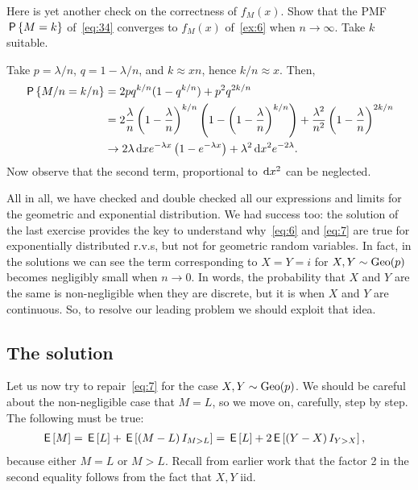 \documentclass[a4paper,12pt]{article}
\begin{document}
\begin{exercise}
Here is yet another check on the correctness of $f_M(x)$. 
Show that  the PMF $\P{M=k}$ of~\cref{eq:34} converges to $f_M(x)$ of~\cref{ex:6} when $n\to \infty$. Take $k$ suitable.
\begin{solution} Take $p=\lambda/n$,  $q=1-\lambda/n$, and $k \approx x n$, hence $k/n \approx x$. Then,
  \begin{align}
    \label{eq:31}
\P{M/n=k/n}  
&= 2 p q^{k/n}(1-q^{k/n}) + p^2q^{2k/n} \\
&= 2 \frac \lambda n \left(1-\frac \lambda n\right)^{k/n}\left(1-\left(1-\frac \lambda n\right)^{k/n}\right) + \frac{\lambda^2}{n^2}\left(1-\frac \lambda n \right)^{2k/n} \\
&\to 2 \lambda \d x e^{-\lambda x} \left(1 - e^{-\lambda x}\right) + \lambda^{2} \d x^{2}e^{-2\lambda}.\label{eq:37}
  \end{align}
Now observe that the second term, proportional to $\d x^{2}$ can be neglected. 
\end{solution}
\end{exercise}

All in all, we have checked and double checked all our expressions and limits for the geometric and exponential distribution.
We had success too: the solution of the last exercise provides the key to understand why~\eqref{eq:6} and \eqref{eq:7} are true for exponentially distributed r.v.s, but not for geometric random variables.
In fact, in the solutions we can see the term corresponding to $X=Y=i$ for $X,Y\sim \Geo{p}$ becomes negligibly small when $n\to 0$.
In words, the probability that $X$ and $Y$ are the same is non-negligible when they are discrete, but it is when $X$ and $Y$ are continuous.
So, to resolve our leading problem we should exploit that idea.

\subsection{The solution}
\label{sec:solution}


Let us now try to repair~\cref{eq:7}  for the case $X,Y\sim\Geo{p}$. We should be careful about the non-negligible case that $M=L$, so we move on, carefully, step by step. The following must be true:
\begin{align}
  \label{eq:40}
\E M &= \E L + \E{(M-L) \1{M>L}}  = \E L + 2\E{(Y-X) \1{Y>X}},
\end{align}
because either $M=L$ or $M>L$.
Recall from earlier work that the factor 2 in the second equality follows from the fact that $X,Y$ iid.
\end{document}
